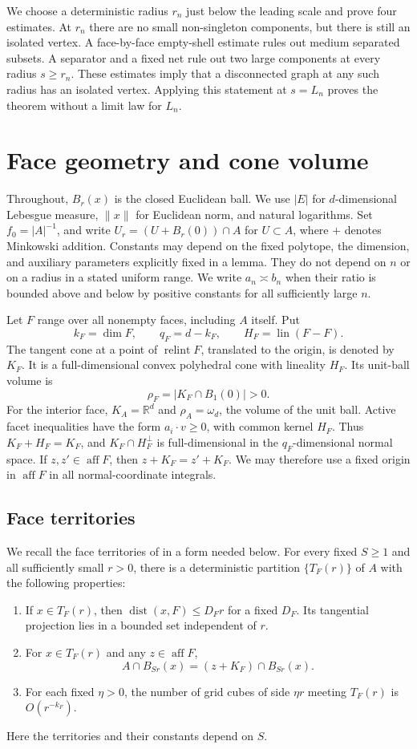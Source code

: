 \documentclass[11pt]{article}
\theoremstyle{remark}
\newcommand{\R}{\mathbb R}
\newcommand{\dist}{\operatorname{dist}}
\newcommand{\aff}{\operatorname{aff}}
\newcommand{\relint}{\operatorname{relint}}
\begin{document}
We choose a deterministic radius $r_n$ just below the leading scale and
prove four estimates. At $r_n$ there are no small non-singleton components,
but there is still an isolated vertex. A face-by-face empty-shell estimate
rules out medium separated subsets. A separator and a fixed net rule out two
large components at every radius $s\geq r_n$. These estimates imply that a
disconnected graph at any such radius has an isolated vertex. Applying this
statement at $s=L_n$ proves the theorem without a limit law for $L_n$.

\section{Face geometry and cone volume}
Throughout, $B_r(x)$ is the closed Euclidean ball. We use $|E|$ for
$d$-dimensional Lebesgue measure, $\|x\|$ for Euclidean norm, and natural
logarithms. Set $f_0=|A|^{-1}$, and write
$U_r=(U+B_r(0))\cap A$ for $U\subset A$, where $+$ denotes Minkowski addition.
Constants may depend on the fixed polytope, the dimension, and auxiliary
parameters explicitly fixed in a lemma. They do not depend on $n$ or on a
radius in a stated uniform range. We write $a_n\asymp b_n$ when their ratio is
bounded above and below by positive constants for all sufficiently large $n$.

Let $F$ range over all nonempty faces, including $A$ itself. Put
\[
 k_F=\dim F,\qquad q_F=d-k_F,\qquad H_F=\operatorname{lin}(F-F).
\]
The tangent cone at a point of $\relint F$, translated to the origin, is
denoted by $K_F$. It is a full-dimensional convex polyhedral cone with
lineality $H_F$. Its unit-ball volume is
\[
 \rho_F=|K_F\cap B_1(0)|>0.
\]
For the interior face, $K_A=\R^d$ and $\rho_A=\omega_d$, the volume of the
unit ball. Active facet inequalities have the form $a_i\cdot v\geq0$, with
common kernel $H_F$. Thus $K_F+H_F=K_F$, and
$K_F\cap H_F^\perp$ is full-dimensional in the $q_F$-dimensional normal space.
If $z,z'\in\aff F$, then $z+K_F=z'+K_F$. We may therefore use a fixed origin
in $\aff F$ in all normal-coordinate integrals.

\subsection{Face territories}
We recall the face territories of \cite[results~3.13--3.17]{PYH} in a form
needed below. For every fixed $S\geq1$ and all sufficiently small $r>0$, there
is a deterministic partition $\{T_F(r)\}$ of $A$ with the following properties:
\begin{enumerate}
\item If $x\in T_F(r)$, then $\dist(x,F)\leq D_F r$ for a fixed $D_F$.
Its tangential projection lies in a bounded set independent of $r$.
\item For $x\in T_F(r)$ and any $z\in\aff F$,
\begin{equation}\label{eq:localcone}
 A\cap B_{Sr}(x)=(z+K_F)\cap B_{Sr}(x).
\end{equation}
\item For each fixed $\eta>0$, the number of grid cubes of side $\eta r$
meeting $T_F(r)$ is $O(r^{-k_F})$.
\end{enumerate}
Here the territories and their constants depend on $S$.
\end{document}

